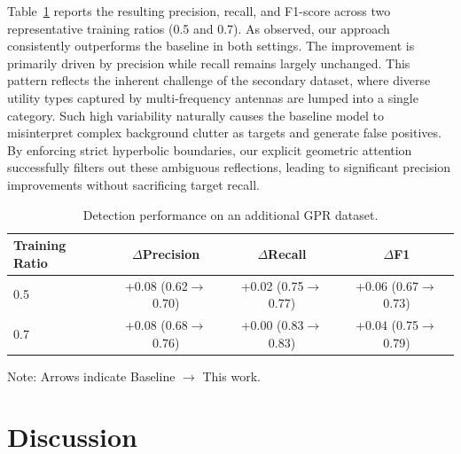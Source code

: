 \documentclass[lettersize,journal]{IEEEtran}
\begin{document}
Table~\ref{tab:generalization} reports the resulting precision, recall, and F1-score across two representative training ratios (0.5 and 0.7).
As observed, our approach consistently outperforms the baseline in both settings. The improvement is primarily driven by precision while recall remains largely unchanged.
This pattern reflects the inherent challenge of the secondary dataset, where diverse utility types captured by multi-frequency antennas are lumped into a single category. Such high variability naturally causes the baseline model to misinterpret complex background clutter as targets and generate false positives. By enforcing strict hyperbolic boundaries, our explicit geometric attention successfully filters out these ambiguous reflections, leading to significant precision improvements without sacrificing target recall.


\begin{table}
    

\centering
\caption{Detection performance on an additional GPR dataset.}
\label{tab:generalization}

\begin{tabular}{lccc}
\toprule
Training Ratio & $\Delta$Precision & $\Delta$Recall & $\Delta$F1 \\
\midrule
0.5 & +0.08 (0.62$\to$0.70) & +0.02 (0.75$\to$0.77) & +0.06 (0.67$\to$0.73) \\
0.7 & +0.08 (0.68$\to$0.76) & +0.00 (0.83$\to$0.83) & +0.04 (0.75$\to$0.79) \\
\bottomrule
\end{tabular}
\par
\vspace{2pt}
\footnotesize Note: Arrows indicate Baseline $\to$ This work.
\end{table}


\section{Discussion}
\end{document}
